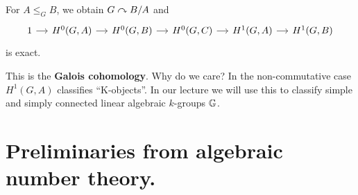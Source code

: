 \begin{outline}
\begin{proposition}
    For $A\leq_G B$, we obtain $G\curvearrowright B/A$ and 
    $$\begin{tikzcd}[column sep=small]
    1 \arrow[r] & H^0(G,A) \arrow[r] & H^0(G,B) \arrow[r] & H^0(G,C) \arrow[r] & H^1(G,A) \arrow[r] & H^1(G,B)
    \end{tikzcd}$$
    is exact.
\end{proposition}

This is the \textbf{Galois cohomology}. Why do we care? In the non-commutative case $H^1(G,A)$ classifies \enquote{K-objects}. In our lecture we will use this to classify simple and simply connected linear algebraic $k$-groups $\mathbb{G}$.

\end{outline}

\section{Preliminaries from algebraic number theory.}

